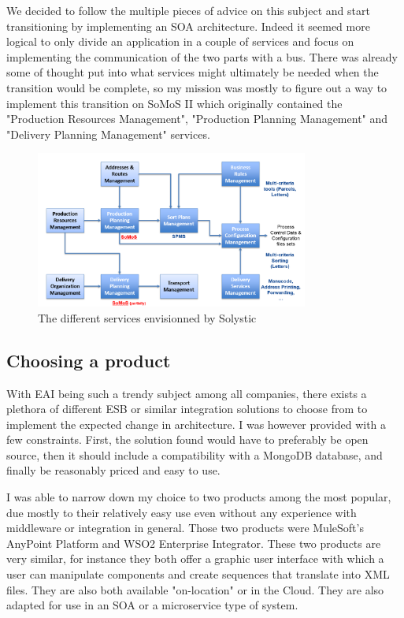 \documentclass[12pt,a4paper,twoside]{article}
\begin{document}
We decided to follow the multiple pieces of advice on this subject and start transitioning by implementing an SOA architecture. Indeed it seemed more logical to only divide an application in a couple of services and focus on implementing the communication of the two parts with a bus. There was already some of thought put into what services might ultimately be needed when the transition would be complete, so my mission was mostly to figure out a way to implement this transition on SoMoS II which originally contained the "Production Resources Management", "Production Planning Management" and "Delivery Planning Management" services. 
\begin{figure}[H]
	\centering
	\includegraphics[width=0.8\textwidth]{services.PNG}
	\caption{\label{Solystic service}The different services envisionned by Solystic}
\end{figure}
\subsection{Choosing a product}
With EAI being such a trendy subject among all companies, there exists a plethora of different ESB or similar integration solutions to choose from to implement the expected change in architecture. 
I was however provided with a few constraints. First, the solution found would have to preferably be open source, then it should include a compatibility with a MongoDB database, and finally be reasonably priced and easy to use.

I was able to narrow down my choice to two products among the most popular, due mostly to their relatively easy use even without any experience with middleware or integration in general. Those two products were MuleSoft's AnyPoint Platform and WSO2 Enterprise Integrator. These two products are very similar, for instance they both offer a graphic user interface with which a user can manipulate components and create sequences that translate into XML files. They are also both available "on-location" or in the Cloud. They are also adapted for use in an SOA or a microservice type of system.
\end{document}
